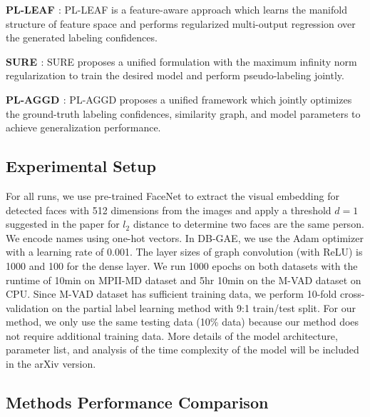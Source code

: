 \documentclass[letterpaper]{article} \usepackage{aaai20}  \usepackage{times}  \usepackage{helvet} \usepackage{courier}  \usepackage[hyphens]{url}  \usepackage{graphicx} \urlstyle{rm} \def\UrlFont{\rm}  \frenchspacing  \setlength{\pdfpagewidth}{8.5in}  \setlength{\pdfpageheight}{11in}  \frenchspacing
\begin{document}
\noindent\textbf{PL-LEAF \cite{zhang2016partial}}: PL-LEAF is a feature-aware approach which learns the manifold structure of feature space and performs regularized multi-output regression over the generated labeling confidences.

\noindent\textbf{SURE \cite{feng2019partial}}: SURE proposes a unified formulation with the maximum infinity norm regularization to train the desired model and perform pseudo-labeling jointly.

\noindent\textbf{PL-AGGD \cite{wang2019adaptive}}: PL-AGGD proposes a unified framework which jointly optimizes the ground-truth labeling confidences, similarity graph, and model parameters to achieve generalization performance.




\subsection{Experimental Setup}
For all runs, we use pre-trained FaceNet \cite{schroff2015facenet} to extract the visual embedding for detected faces with 512 dimensions from the images and apply a threshold $d=1$ suggested in the paper \cite{schroff2015facenet} for $l_2$ distance to determine two faces are the same person. We encode names using one-hot vectors. In DB-GAE, we use the Adam optimizer \cite{kingma2014adam} with a learning rate of 0.001. The layer sizes of graph convolution (with ReLU) is 1000 and 100 for the dense layer. We run 1000 epochs on both datasets with the runtime of 10min on MPII-MD dataset and 5hr 10min on the M-VAD dataset on CPU.
 Since M-VAD dataset has sufficient training data, we perform 10-fold cross-validation on the partial label learning method with 9:1 train/test split. For our method, we only use the same testing data (10\% data) because our method does not require additional training data. More details of the model architecture, parameter list, and analysis of the time complexity of the model will be included in the arXiv version.



 



\subsection{Methods Performance Comparison}
\end{document}
